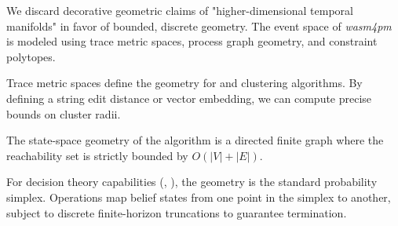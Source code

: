 We discard decorative geometric claims of "higher-dimensional temporal manifolds" in favor of bounded, discrete geometry. The event space of \textit{wasm4pm} is modeled using trace metric spaces, process graph geometry, and constraint polytopes.

Trace metric spaces define the geometry for  and clustering algorithms. By defining a string edit distance or vector embedding, we can compute precise bounds on cluster radii. 

\begin{proposition}
The state-space geometry of the  algorithm is a directed finite graph where the reachability set is strictly bounded by $O(|V| + |E|)$.
\end{proposition}

For decision theory capabilities (, ), the geometry is the standard probability simplex. Operations map belief states from one point in the simplex to another, subject to discrete finite-horizon truncations to guarantee termination.
